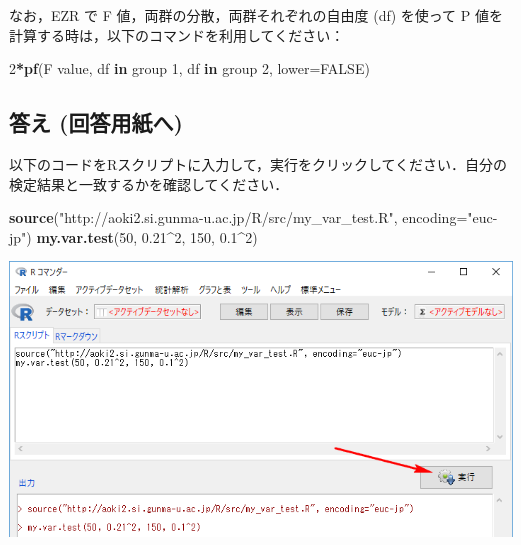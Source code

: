 \documentclass[11pt,]{problemset}
\newenvironment{Shaded}{\begin{snugshade}}{\end{snugshade}}
\newcommand{\ControlFlowTok}[1]{\textcolor[rgb]{0.13,0.29,0.53}{\textbf{#1}}}
\newcommand{\DataTypeTok}[1]{\textcolor[rgb]{0.13,0.29,0.53}{#1}}
\newcommand{\DecValTok}[1]{\textcolor[rgb]{0.00,0.00,0.81}{#1}}
\newcommand{\FloatTok}[1]{\textcolor[rgb]{0.00,0.00,0.81}{#1}}
\newcommand{\KeywordTok}[1]{\textcolor[rgb]{0.13,0.29,0.53}{\textbf{#1}}}
\newcommand{\NormalTok}[1]{#1}
\newcommand{\OperatorTok}[1]{\textcolor[rgb]{0.81,0.36,0.00}{\textbf{#1}}}
\newcommand{\OtherTok}[1]{\textcolor[rgb]{0.56,0.35,0.01}{#1}}
\newcommand{\StringTok}[1]{\textcolor[rgb]{0.31,0.60,0.02}{#1}}
\begin{document}
なお，EZR で F 値，両群の分散，両群それぞれの自由度 (df) を使って P
値を計算する時は，以下のコマンドを利用してください：

\begin{Shaded}
\begin{Highlighting}[]
\DecValTok{2}\OperatorTok{*}\KeywordTok{pf}\NormalTok{(F value, df }\ControlFlowTok{in}\NormalTok{ group }\DecValTok{1}\NormalTok{, df }\ControlFlowTok{in}\NormalTok{ group }\DecValTok{2}\NormalTok{, }\DataTypeTok{lower=}\OtherTok{FALSE}\NormalTok{)}
\end{Highlighting}
\end{Shaded}

\hypertarget{--1}{%
\subsection{答え (回答用紙へ)}\label{--1}}

以下のコードをRスクリプトに入力して，実行をクリックしてください．自分の検定結果と一致するかを確認してください．

\begin{Shaded}
\begin{Highlighting}[]
\KeywordTok{source}\NormalTok{(}\StringTok{"http://aoki2.si.gunma-u.ac.jp/R/src/my_var_test.R"}\NormalTok{, }\DataTypeTok{encoding=}\StringTok{"euc-jp"}\NormalTok{)}
\KeywordTok{my.var.test}\NormalTok{(}\DecValTok{50}\NormalTok{, }\FloatTok{0.21}\OperatorTok{^}\DecValTok{2}\NormalTok{, }\DecValTok{150}\NormalTok{, }\FloatTok{0.1}\OperatorTok{^}\DecValTok{2}\NormalTok{)}
\end{Highlighting}
\end{Shaded}

\bigskip\bigskip\bigskip\bigskip\bigskip

\begin{center}\includegraphics[width=0.9\linewidth]{pic/ftest01cut} \end{center}
\end{document}
